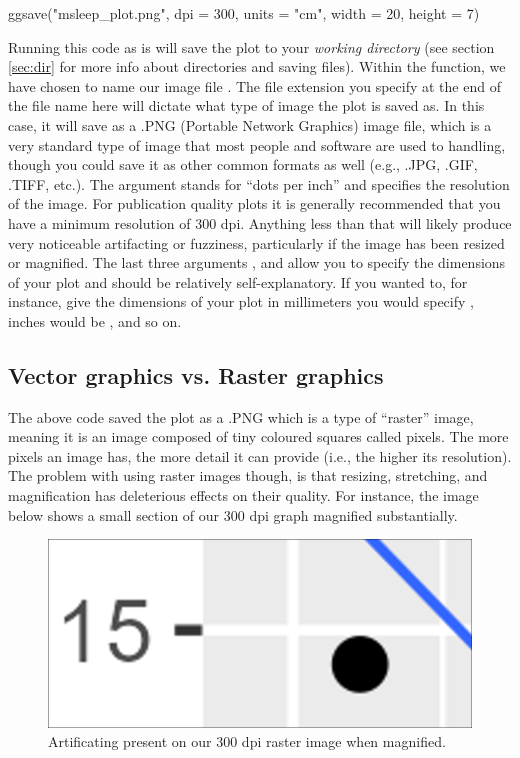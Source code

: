 \begin{inR}
ggsave("msleep_plot.png", dpi = 300, units = "cm", width = 20, height = 7)
\end{inR}
\vspace{1em}

Running this code as is will save the plot to your \textit{working directory} (see section \ref{sec:dir} for more info about directories and saving files). Within the function, we have chosen to name our image file . The file extension you specify at the end of the file name here will dictate what type of image the plot is saved as.  In this case, it will save as a .PNG (Portable Network Graphics) image file, which is a very standard type of image that most people and software are used to handling, though you could save it as other common formats as well (e.g., .JPG, .GIF, .TIFF, etc.). The argument  stands for ``dots per inch'' and specifies the resolution of the image. For publication quality plots it is generally recommended that you have a minimum resolution of 300 dpi.  Anything less than that will likely produce very noticeable artifacting or fuzziness, particularly if the image has been resized or magnified. The last three arguments ,  and  allow you to specify the dimensions of your plot and should be relatively self-explanatory. If you wanted to, for instance, give the dimensions of your plot in millimeters you would specify , inches would be , and so on.

\subsection{Vector graphics vs. Raster graphics}

The above code saved the plot as a .PNG which is a type of ``raster'' image, meaning it is an image composed of tiny coloured squares called pixels. The more pixels an image has, the more detail it can provide (i.e., the higher its resolution). The problem with using raster images though, is that resizing, stretching, and magnification has deleterious effects on their quality.  For instance, the image below shows a small section of our 300 dpi graph magnified substantially.

\vspace{1em}

\begin{figure}[H]
\centering
\includegraphics[scale = .3]{graphics/ch2Figs/artifacting_1.png}
\caption{Artificating present on our 300 dpi raster image when magnified.}
\end{figure}

